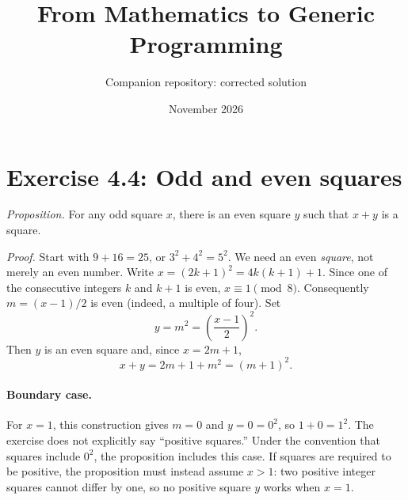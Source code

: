 \documentclass{article}
\title{From Mathematics to Generic Programming}
\author{Companion repository: corrected solution}
\date{November 2026}
\begin{document}
\maketitle
\section*{Exercise 4.4: Odd and even squares}
\textit{Proposition.} For any odd square $x$, there is an even square $y$
such that $x+y$ is a square.

\textit{Proof.} Start with $9+16=25$, or $3^2+4^2=5^2$.
We need an even \emph{square}, not merely an even number.
Write $x=(2k+1)^2=4k(k+1)+1$. Since one of the consecutive integers
$k$ and $k+1$ is even, $x\equiv1\pmod8$.
Consequently $m=(x-1)/2$ is even (indeed, a multiple of four).
Set
\[
 y=m^2=\left(\frac{x-1}{2}\right)^2.
\]
Then $y$ is an even square and, since $x=2m+1$,
\[
 x+y=2m+1+m^2=(m+1)^2.
\]

\paragraph{Boundary case.}
For $x=1$, this construction gives $m=0$ and $y=0=0^2$, so
$1+0=1^2$. The exercise does not explicitly say ``positive squares.''
Under the convention that squares include $0^2$, the proposition includes
this case. If squares are required to be positive, the proposition must
instead assume $x>1$: two positive integer squares cannot differ by one,
so no positive square $y$ works when $x=1$.
\end{document}
